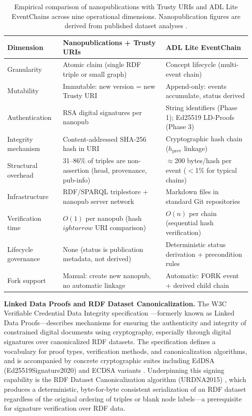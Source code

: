 \begin{table}[h]
\centering
\caption{Empirical comparison of nanopublications with Trusty URIs and ADL Lite EventChains across nine operational dimensions. Nanopublication figures are derived from published dataset analyses \cite{ref40,ref41,ref42}.}
\label{tab:nanopub-comparison}
\begin{tabular}{@{}p{3.2cm}p{5.0cm}p{5.0cm}@{}}
\toprule
\textbf{Dimension} & \textbf{Nanopublications + Trusty URIs} & \textbf{ADL Lite EventChain} \\
\midrule
Granularity & Atomic claim (single RDF triple or small graph) & Concept lifecycle (multi-event chain) \\
Mutability & Immutable: new version = new Trusty URI & Append-only: events accumulate, status derived \\
Authentication & RSA digital signatures per nanopub & String identifiers (Phase 1); Ed25519 LD-Proofs (Phase 3) \\
Integrity mechanism & Content-addressed SHA-256 hash in URI & Cryptographic hash chain ($h_{\text{prev}}$ linkage) \\
Structural overhead & 31--86\% of triples are non-assertion (head, provenance, pub-info) & $\approx$200 bytes/hash per event ($<$1\% for typical chains) \\
Infrastructure & RDF/SPARQL triplestore + nanopub server network & Markdown files in standard Git repositories \\
Verification time & $O(1)$ per nanopub (hash $
ightarrow$ URI comparison) & $O(n)$ per chain (sequential hash verification) \\
Lifecycle governance & None (status is publication metadata, not derived) & Deterministic status derivation + precondition rules \\
Fork support & Manual: create new nanopub, no automatic linkage & Automatic: \textsc{FORK} event + derived child chain \\
\bottomrule
\end{tabular}
\end{table}

\textbf{Linked Data Proofs and RDF Dataset Canonicalization.} The W3C Verifiable Credential Data Integrity specification \cite{ref43}---formerly known as Linked Data Proofs---describes mechanisms for ensuring the authenticity and integrity of constrained digital documents using cryptography, especially through digital signatures over canonicalized RDF datasets. The specification defines a vocabulary for proof types, verification methods, and canonicalization algorithms, and is accompanied by concrete cryptographic suites including EdDSA (Ed25519Signature2020) and ECDSA variants \cite{ref44}. Underpinning this signing capability is the RDF Dataset Canonicalization algorithm (URDNA2015) \cite{ref45}, which produces a deterministic, byte-for-byte consistent serialization of an RDF dataset regardless of the original ordering of triples or blank node labels---a prerequisite for signature verification over RDF data.

